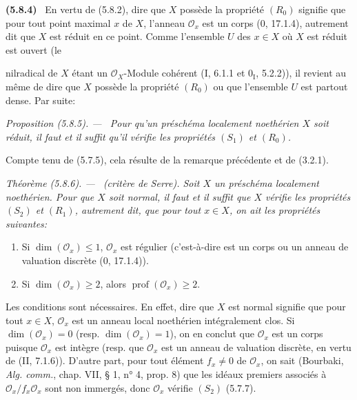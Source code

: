 \documentclass[10pt,oneside]{book}
\makeatletter
\newcommand{\oldpage}[2][]{%
  \setcounter{footnote}{0}%
  \marginpar{\scriptsize\textbf{#1}~|~#2}\ignorespaces}
\newenvironment{env}[1][]{\par\medskip\noindent\textbf{(#1)}\ }{\par}
\newenvironment{proposition}[1][]{%
  \par\medskip\noindent\itshape Proposition (#1). ---\ }{\par}
\newenvironment{theorem}[1][]{%
  \par\medskip\noindent\itshape Théorème (#1). ---\ }{\par}
\newcommand{\EGAReaderTarget}[2]{\hypertarget{#1}{}\@bsphack\begingroup\def\@currentHref{#1}\label{#2}\endgroup\@esphack}
\makeatother
\begin{document}
\begin{env}[5.8.4]
\label{IV.2.s5.8.4-fr}
En vertu de (5.8.2), dire que $X$ possède la propriété $(R_0)$ signifie que
pour tout point maximal $x$ de $X$, l'anneau $\mathcal O_x$ est un corps
(0, 17.1.4), autrement dit que $X$ est réduit en ce point. Comme l'ensemble
$U$ des $x\in X$ où $X$ est réduit est ouvert (le

\oldpage[IV-2]{108}

nilradical de $X$ étant un $\mathcal O_X$-Module cohérent (I, 6.1.1 et
$0_{\mathrm I}$, 5.2.2)), il revient au même de dire que $X$ possède la
propriété $(R_0)$ ou que l'ensemble $U$ est partout dense. Par suite:
\end{env}

\begin{proposition}[5.8.5]
\label{IV.2.s5.8.5-fr}
Pour qu'un préschéma localement noethérien $X$ soit réduit, il faut et il
suffit qu'il vérifie les propriétés $(S_1)$ et $(R_0)$.
\end{proposition}

Compte tenu de (5.7.5), cela résulte de la remarque précédente et de (3.2.1).

\begin{theorem}[5.8.6]
\EGAReaderTarget{ega4.c04.thm.5-8-6}{IV.2.s5.8.6-fr}
(critère de Serre). Soit $X$ un préschéma localement noethérien. Pour que
$X$ soit normal, il faut et il suffit que $X$ vérifie les propriétés $(S_2)$
et $(R_1)$, autrement dit, que pour tout $x\in X$, on ait les propriétés
suivantes:
\begin{enumerate}
\item[(i)] Si $\dim(\mathcal O_x)\leq1$, $\mathcal O_x$ est régulier
(c'est-à-dire est un corps ou un anneau de valuation discrète (0, 17.1.4)).
\item[(ii)] Si $\dim(\mathcal O_x)\geq2$, alors
$\operatorname{prof}(\mathcal O_x)\geq2$.
\end{enumerate}
\end{theorem}

Les conditions sont nécessaires. En effet, dire que $X$ est normal signifie
que pour tout $x\in X$, $\mathcal O_x$ est un anneau local noethérien
intégralement clos. Si $\dim(\mathcal O_x)=0$ (resp.
$\dim(\mathcal O_x)=1$), on en conclut que $\mathcal O_x$ est un corps
puisque $\mathcal O_x$ est intègre (resp. que $\mathcal O_x$ est un anneau
de valuation discrète, en vertu de (II, 7.1.6)). D'autre part, pour tout
élément $f_x\neq0$ de $\mathcal O_x$, on sait (Bourbaki, \emph{Alg. comm.},
chap. VII, § 1, n° 4, prop. 8) que les idéaux premiers associés à
$\mathcal O_x/f_x\mathcal O_x$ sont non immergés, donc $\mathcal O_x$
vérifie $(S_2)$ (5.7.7).
\end{document}
